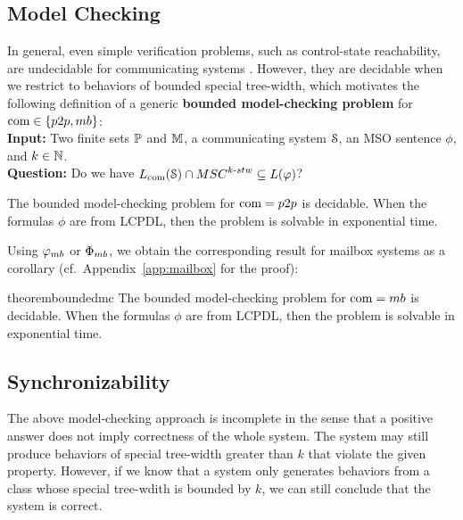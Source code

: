 \documentclass[a4paper,UKenglish,cleveref, autoref, thm-restate]{lipics-v2021}
\begin{document}
\subsection{Model Checking}

In general, even simple verification problems, such
as control-state reachability, are undecidable for
communicating systems \cite{DBLP:journals/jacm/BrandZ83}.
However, they are decidable when we restrict to behaviors of
bounded special tree-width, which motivates the following
definition of a generic {\bf bounded model-checking problem} for $\comsymb \in \{\ppsymb, \mbsymb\}$:\\
{\bf Input:} Two finite sets $\mathbb{P}$ and $\mathbb{M}$, a communicating system $\mathcal{S}$, an MSO sentence $\phi$, and $k \in \mathbb{N}$.\\
{\bf Question:} Do we have $\cL{\Sys} \cap \stwMSCs{k} \subseteq L(\phi)$?


\newcommand{\CS}[2]{\mathsf{CS}_{(#1,#2)}}
\newcommand{\MSO}[2]{\mathsf{MSO}_{(#1,#2)}}
\newcommand{\LCPDL}[2]{\mathsf{LCPDL}_{(#1,#2)}}
\newcommand{\MSCpm}[2]{\mathsf{MSC}_{(#1,#2)}}
\newcommand{\mbMSCpm}[2]{\mathsf{MSC}_{(#1,#2)}^{\mathsf{mb}}}


\begin{fact}\label{p2p}
The bounded model-checking problem for $\comsymb = \ppsymb$ is decidable.
When the formulas $\phi$ are from LCPDL, then the problem is solvable
in exponential time.
\end{fact}

Using $\mbformula$ or $\mbFormula$, we obtain the corresponding result
for mailbox systems as a corollary (cf.\ Appendix~\ref{app:mailbox} for the proof):

\begin{restatable}{theorem}{boundedmc}
\label{mailbox}
The bounded model-checking problem for $\comsymb =  \mbsymb$ is decidable.
When the formulas $\phi$ are from LCPDL, then the problem is solvable
in exponential time.
\end{restatable}



\subsection{Synchronizability}

The above model-checking approach is incomplete in the sense that
a positive answer does not imply correctness of the whole
system. The system may still produce behaviors of special tree-width greater than $k$
that violate the given property.
However, if we know that a system only generates
behaviors from a class whose special tree-wdith is bounded by $k$,
we can still conclude that the system is correct.
\end{document}
